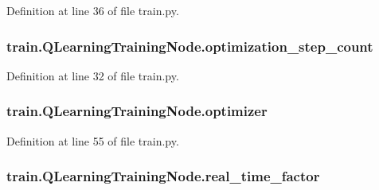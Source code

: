 Definition at line 36 of file train.\+py.

\subsubsection[{\texorpdfstring{optimization\+\_\+step\+\_\+count}{optimization_step_count}}]{\setlength{\rightskip}{0pt plus 5cm}train.\+Q\+Learning\+Training\+Node.\+optimization\+\_\+step\+\_\+count}\hypertarget{classtrain_1_1_q_learning_training_node_a876c1cedd4eabcca4e9a0ee6e0922752}{}\label{classtrain_1_1_q_learning_training_node_a876c1cedd4eabcca4e9a0ee6e0922752}


Definition at line 32 of file train.\+py.

\subsubsection[{\texorpdfstring{optimizer}{optimizer}}]{\setlength{\rightskip}{0pt plus 5cm}train.\+Q\+Learning\+Training\+Node.\+optimizer}\hypertarget{classtrain_1_1_q_learning_training_node_a2cd6ba599812ec0edffba7869f4f27d9}{}\label{classtrain_1_1_q_learning_training_node_a2cd6ba599812ec0edffba7869f4f27d9}


Definition at line 55 of file train.\+py.

\subsubsection[{\texorpdfstring{real\+\_\+time\+\_\+factor}{real_time_factor}}]{\setlength{\rightskip}{0pt plus 5cm}train.\+Q\+Learning\+Training\+Node.\+real\+\_\+time\+\_\+factor}\hypertarget{classtrain_1_1_q_learning_training_node_a407532bec47855fec93201fa87fe80ab}{}\label{classtrain_1_1_q_learning_training_node_a407532bec47855fec93201fa87fe80ab}


